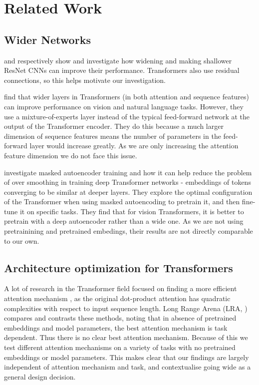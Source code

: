 \section{Related Work}


\subsection{Wider Networks}

\citet{cnn_wide} and \citet{cnn_wide_v_deep} respectively show and investigate how widening and making shallower ResNet CNNs \citep{resnet} can improve their performance.
Transformers also use residual connections, so this helps motivate our investigation.

\citet{go_wide} find that wider layers in Transformers (in both attention and sequence features) can improve performance on vision and natural language tasks.
However, they use a mixture-of-experts layer instead of the typical feed-forward network at the output of the Transformer encoder.
They do this because a much larger dimension of sequence features means the number of parameters in the feed-forward layer would increase greatly.
As we are only increasing the attention feature dimension we do not face this issue.

\citet{deeper_vs_wider} investigate masked autoencoder training and how it can help reduce the problem of over smoothing in training deep Transformer networks - embeddings of tokens converging to be similar at deeper layers.
They explore the optimal configuration of the Transformer when using masked autoencoding to pretrain it, and then fine-tune it on specific tasks.
They find that for vision Transformers, it is better to pretrain with a deep autoencoder rather than a wide one.
As we are not using pretrainining and pretrained embedings, their results are not directly comparable to our own.


\subsection{Architecture optimization for Transformers}

A lot of research in the Transformer field focused on finding a more efficient attention mechanism \citep{linear_tfm, linformer, bigbird, local_tfm, longformer, performer, reformer, sinkhorn, sparse_tfm, synthesizer}, as the original dot-product attention has quadratic complexities with respect to input sequence length.
Long Range Arena (LRA, \citet{lra}) compares and contrasts these methods, noting that in absence of pretrained embeddings and model parameters, the best attention mechanism is task dependent.
Thus there is no clear best attention mechanism.
Because of this we test different attention mechanisms on a variety of tasks with no pretrained embeddings or model parameters.
This makes clear that our findings are largely independent of attention mechanism and task, and contextualise going wide as a general design decision.

